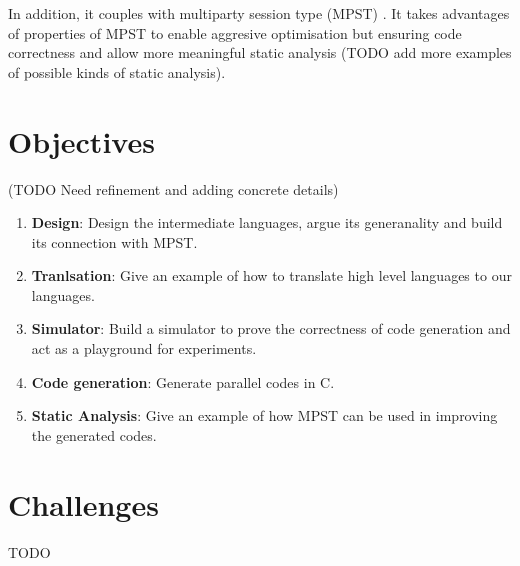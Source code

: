 In addition, it couples with multiparty session type (MPST) \cite{coppoGentleIntroductionMultiparty2015}. It takes advantages of properties of MPST to enable aggresive optimisation but ensuring code correctness and allow more meaningful static analysis (TODO add more examples of possible kinds of static analysis).

\section{Objectives}
(TODO Need refinement and adding concrete details)
\begin{enumerate}
\item \textbf{Design}: Design the intermediate languages, argue its generanality and build its connection with MPST. 
\item \textbf{Tranlsation}: Give an example of how to translate high level languages to our languages. 
\item \textbf{Simulator}: Build a simulator to prove the correctness of code generation and act as a playground for experiments.
\item \textbf{Code generation}: Generate parallel codes in C.
\item \textbf{Static Analysis}: Give an example of how MPST can be used in improving the generated codes.
\end{enumerate}
\section{Challenges}
TODO
